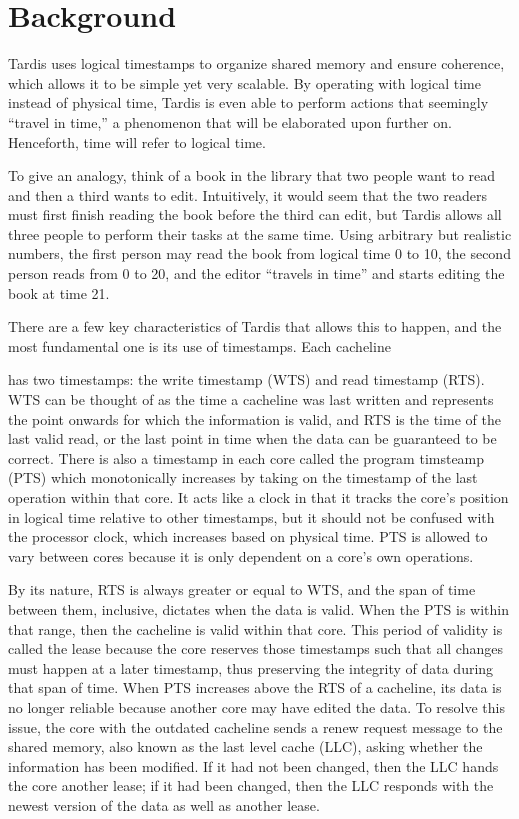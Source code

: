 \documentclass[12pt]{article}
\begin{document}
\section{Background}
\label{sec:background}

Tardis uses logical timestamps to organize shared memory and ensure coherence, which allows it to be simple yet very scalable. By operating with logical time instead of physical time, Tardis is even able to perform actions that seemingly “travel in time,” a phenomenon that will be elaborated upon further on. Henceforth, time will refer to logical time.


To give an analogy, think of a book in the library that two people want to read and then a third wants to edit. Intuitively, it would seem that the two readers must first finish reading the book before the third can edit, but Tardis allows all three people to perform their tasks at the same time.  Using arbitrary but realistic numbers, the first person may read the book from logical time 0 to 10, the second person reads from 0 to 20, and the editor “travels in time” and starts editing the book at time 21.


There are a few key characteristics of Tardis that allows this to happen, and the most fundamental one is its use of timestamps. Each cacheline has two timestamps: the write timestamp (WTS) and read timestamp (RTS). WTS can be thought of as the time a cacheline was last written and represents the point onwards for which the information is valid, and RTS is the time of the last valid read, or the last point in time when the data can be guaranteed to be correct. There is also a timestamp in each core called the program timsteamp (PTS) which monotonically increases by taking on the timestamp of the last operation within that core. It acts like a clock in that it tracks the core's position in logical time relative to other timestamps, but it should not be confused with the processor clock, which increases based on physical time. PTS is allowed to vary between cores because it is only dependent on a core's own operations.


By its nature, RTS is always greater or equal to WTS, and the span of time between them, inclusive, dictates when the data is valid. When the PTS is within that range, then the cacheline is valid within that core. This period of validity is called the lease because the core reserves those timestamps such that all changes must happen at a later timestamp, thus preserving the integrity of data during that span of time. When PTS increases above the RTS of a cacheline, its data is no longer reliable because another core may have edited the data. To resolve this issue, the core with the outdated cacheline sends a renew request message to the shared memory, also known as the last level cache (LLC), asking whether the information has been modified. If it had not been changed, then the LLC hands the core another lease; if it had been changed, then the LLC responds with the newest version of the data as well as another lease.
\end{document}
